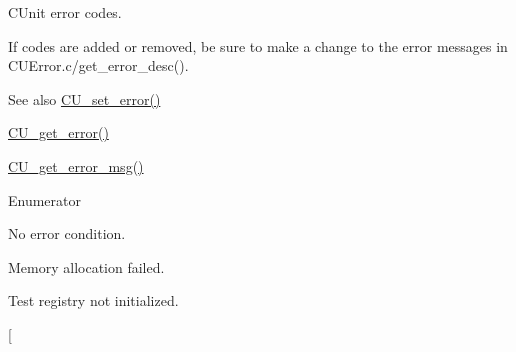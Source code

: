 C\+Unit error codes. 

If codes are added or removed, be sure to make a change to the error messages in C\+U\+Error.\+c/get\+\_\+error\+\_\+desc(). \begin{DoxySeeAlso}{See also}
\hyperlink{group___framework_ga58bf87d9e3fa751ca0c5d2aea7f846b7}{C\+U\+\_\+set\+\_\+error()} 

\hyperlink{group___framework_ga0bf3f9733e5fa0c0ed6ca0a37a2d995e}{C\+U\+\_\+get\+\_\+error()} 

\hyperlink{group___framework_gaee27bf496da77437288bc9fe2a0b20ed}{C\+U\+\_\+get\+\_\+error\+\_\+msg()} 
\end{DoxySeeAlso}
\begin{Desc}
\item[Enumerator]\par
\begin{description}
\item[{\em 
\hypertarget{group___framework_gga743a2a025ee3eb792d7d85f0eea347e6afcb0cc348cf634702f1c5e25935d44a8}{C\+U\+E\+\_\+\+S\+U\+C\+C\+E\+S\+S}\label{group___framework_gga743a2a025ee3eb792d7d85f0eea347e6afcb0cc348cf634702f1c5e25935d44a8}
}]No error condition. \item[{\em 
\hypertarget{group___framework_gga743a2a025ee3eb792d7d85f0eea347e6a2f82abb90b2a2d492db87e448fe94695}{C\+U\+E\+\_\+\+N\+O\+M\+E\+M\+O\+R\+Y}\label{group___framework_gga743a2a025ee3eb792d7d85f0eea347e6a2f82abb90b2a2d492db87e448fe94695}
}]Memory allocation failed. \item[{\em 
\hypertarget{group___framework_gga743a2a025ee3eb792d7d85f0eea347e6a16db381bf73522f2066dbbb2324ae43e}{C\+U\+E\+\_\+\+N\+O\+R\+E\+G\+I\+S\+T\+R\+Y}\label{group___framework_gga743a2a025ee3eb792d7d85f0eea347e6a16db381bf73522f2066dbbb2324ae43e}
}]Test registry not initialized. \item[{\em 
}
\end{description}
\end{Desc}
